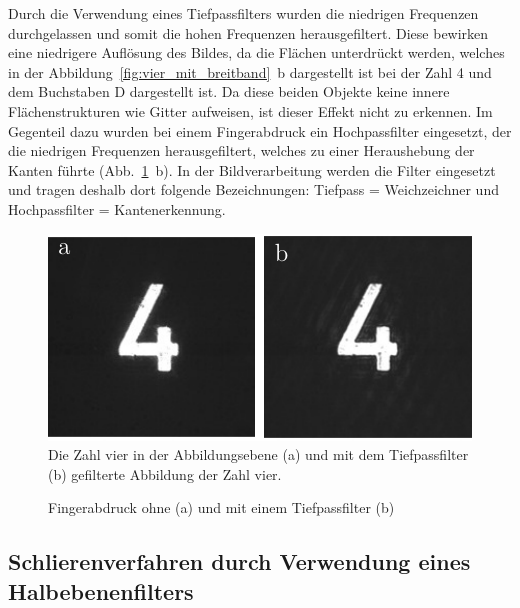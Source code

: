 Durch die Verwendung eines Tiefpassfilters wurden die niedrigen Frequenzen durchgelassen und somit die hohen Frequenzen herausgefiltert. Diese bewirken eine niedrigere Auflösung des
Bildes, da die Flächen unterdrückt werden, welches in der Abbildung~\ref{fig:vier_mit_breitband}~b dargestellt ist bei der Zahl 4 und dem Buchstaben D dargestellt ist. Da diese beiden Objekte keine innere Flächenstrukturen wie Gitter aufweisen, ist dieser Effekt nicht zu erkennen.
Im Gegenteil dazu wurden bei einem Fingerabdruck ein Hochpassfilter eingesetzt, der die niedrigen Frequenzen herausgefiltert, welches zu einer Heraushebung der Kanten führte (Abb.~\ref{fig:vier_mit_tiefpass}~b). In der Bildverarbeitung werden die Filter eingesetzt und tragen deshalb dort folgende Bezeichnungen: Tiefpass = Weichzeichner und Hochpassfilter = Kantenerkennung.

\begin{figure}[h]
	\centering
	\includegraphics{images/Regina/abb23.pdf}
	\caption[Zahl 4 mit Tiefpassfilter]{
		Die Zahl vier in der Abbildungsebene (a) und mit dem Tiefpassfilter (b) gefilterte Abbildung der Zahl vier.
	}
	\label{fig:vier_mit_tiefpass}
\end{figure}

\begin{figure}[h]
	\centering
	\caption[Abbildung Fingerabdruck mit Tiefpassfilter]{Fingerabdruck ohne (a) und mit einem Tiefpassfilter (b)}
	\label{fig:fingerabdruck_mit_filtern}
\end{figure}

\subsection{Schlierenverfahren durch Verwendung eines Halbebenenfilters}

